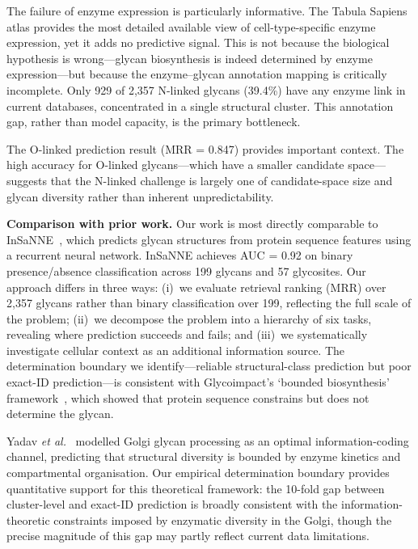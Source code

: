 \documentclass[11pt,a4paper]{article}
\begin{document}
The failure of enzyme expression is particularly informative. The Tabula Sapiens
atlas provides the most detailed available view of cell-type-specific enzyme
expression, yet it adds no predictive signal. This is not because the biological
hypothesis is wrong---glycan biosynthesis is indeed determined by enzyme
expression---but because the enzyme--glycan annotation mapping is critically
incomplete. Only 929 of 2,357 N-linked glycans (39.4\%) have any enzyme link in
current databases, concentrated in a single structural cluster. This annotation
gap, rather than model capacity, is the primary bottleneck.

The O-linked prediction result (MRR = 0.847) provides important context. The
high accuracy for O-linked glycans---which have a smaller candidate
space---suggests that the N-linked challenge is largely one of candidate-space
size and glycan diversity rather than inherent unpredictability.

\textbf{Comparison with prior work.} Our work is most directly comparable to
InSaNNE~\cite{kellman2024}, which predicts glycan structures from protein
sequence features using a recurrent neural network. InSaNNE achieves AUC = 0.92
on binary presence/absence classification across 199 glycans and 57 glycosites.
Our approach differs in three ways: (i)~we evaluate retrieval ranking (MRR) over
2,357 glycans rather than binary classification over 199, reflecting the full
scale of the problem; (ii)~we decompose the problem into a hierarchy of six
tasks, revealing where prediction succeeds and fails; and (iii)~we systematically
investigate cellular context as an additional information source. The
determination boundary we identify---reliable structural-class prediction but
poor exact-ID prediction---is consistent with Glycoimpact's `bounded
biosynthesis' framework~\cite{glycoimpact2024}, which showed that protein
sequence constrains but does not determine the glycan.

Yadav \textit{et al.}~\cite{yadav2022} modelled Golgi glycan processing as an
optimal information-coding channel, predicting that structural diversity is
bounded by enzyme kinetics and compartmental organisation. Our empirical
determination boundary provides quantitative support for this theoretical
framework: the 10-fold gap between cluster-level and exact-ID prediction is broadly consistent with the information-theoretic constraints imposed by enzymatic diversity in the Golgi, though the precise magnitude of this gap may partly reflect current data limitations.
\end{document}
